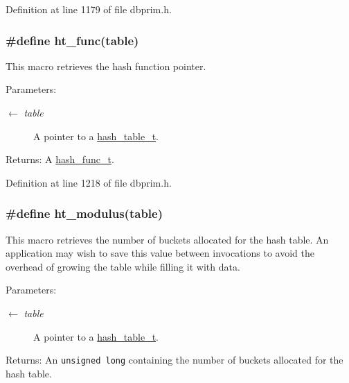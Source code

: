 Definition at line 1179 of file dbprim.h.\hypertarget{group__dbprim__hash_ga31}{
\subsubsection[ht\_\-func]{\setlength{\rightskip}{0pt plus 5cm}\#define ht\_\-func(table)}}
\label{group__dbprim__hash_ga31}


This macro retrieves the hash function pointer.

\begin{Desc}
\item[Parameters:]
\begin{description}
\item[\mbox{$\leftarrow$} {\em table}]A pointer to a \hyperlink{group__dbprim__hash_ga1}{hash\_\-table\_\-t}.\end{description}
\end{Desc}
\begin{Desc}
\item[Returns:]A \hyperlink{group__dbprim__hash_ga4}{hash\_\-func\_\-t}.\end{Desc}


Definition at line 1218 of file dbprim.h.\hypertarget{group__dbprim__hash_ga29}{
\subsubsection[ht\_\-modulus]{\setlength{\rightskip}{0pt plus 5cm}\#define ht\_\-modulus(table)}}
\label{group__dbprim__hash_ga29}


This macro retrieves the number of buckets allocated for the hash table. An application may wish to save this value between invocations to avoid the overhead of growing the table while filling it with data.

\begin{Desc}
\item[Parameters:]
\begin{description}
\item[\mbox{$\leftarrow$} {\em table}]A pointer to a \hyperlink{group__dbprim__hash_ga1}{hash\_\-table\_\-t}.\end{description}
\end{Desc}
\begin{Desc}
\item[Returns:]An {\tt unsigned long} containing the number of buckets allocated for the hash table.\end{Desc}


